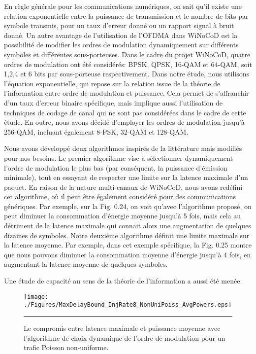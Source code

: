 En règle générale pour les communications numériques, on sait qu’il existe une relation exponentielle entre la puissance de transmission et le nombre de bits par symbole transmis, pour un taux d'erreur donné ou un rapport signal à bruit donné. Un autre avantage de l'utilisation de l'OFDMA dans WiNoCoD est la possibilité de modifier les ordres de modulation dynamiquement sur différents symboles et différentes sous-porteuses. Dans le cadre du projet WiNoCoD, quatre ordres de modulation ont été considérés: BPSK, QPSK, 16-QAM et 64-QAM, soit 1,2,4 et 6 bits par sous-porteuse respectivement. Dans notre étude, nous utilisons l'équation exponentielle, qui repose sur la relation issue de la théorie de l'information entre ordre de modulation et puissance. Cela permet de s’affranchir d'un taux d'erreur binaire spécifique, mais implique aussi l’utilisation de techniques de codage de canal qui ne sont pas considérées dans le cadre de cette étude. En outre, nous avons décidé d'employer les ordres de modulation jusqu'à 256-QAM, incluant également 8-PSK, 32-QAM et 128-QAM. 

Nous avons développé deux algorithmes inspirés de la littérature mais modifiés pour nos besoins. Le premier algorithme vise à sélectionner dynamiquement l'ordre de modulation le plus bas (par conséquent, la puissance d'émission minimale), tout en essayant de respecter une limite sur la latence maximale d'un paquet. En raison de la nature multi-canaux de WiNoCoD, nous avons redéfini cet algorithme, où il peut être également considéré pour des communications génériques. Par exemple, sur la Fig. 0.24, on voit qu’avec l'algorithme proposé, on peut diminuer la consommation d'énergie moyenne jusqu'à 5 fois, mais cela au détriment de la latence maximale qui connait alors une augmentation de quelques dizaines de symboles. Notre deuxième algorithme définit une limite maximale sur la latence moyenne. Par exemple, dans cet exemple spécifique, la Fig. 0.25 montre que nous pouvons diminuer la consommation moyenne d'énergie jusqu'à 4 fois, en augmentant la latence moyenne de quelques symboles. 

Une étude de capacité au sens de la théorie de l'information a aussi été menée.

\begin{figure}[htbp]
  \centering
    \texttt{[image: ./Figures/MaxDelayBound\_InjRate8\_NonUniPoiss\_AvgPowers.eps]}
    \rule{35em}{0.5pt}
  \caption[Le compromis entre latence maximale et puissance moyenne avec l'algorithme de choix dynamique de l'ordre de modulation pour un trafic Poisson non-uniforme.]{Le compromis entre latence maximale et puissance moyenne avec l'algorithme de choix dynamique de l'ordre de modulation pour un trafic Poisson non-uniforme.}
  \label{fig:Electron}
\end{figure}

